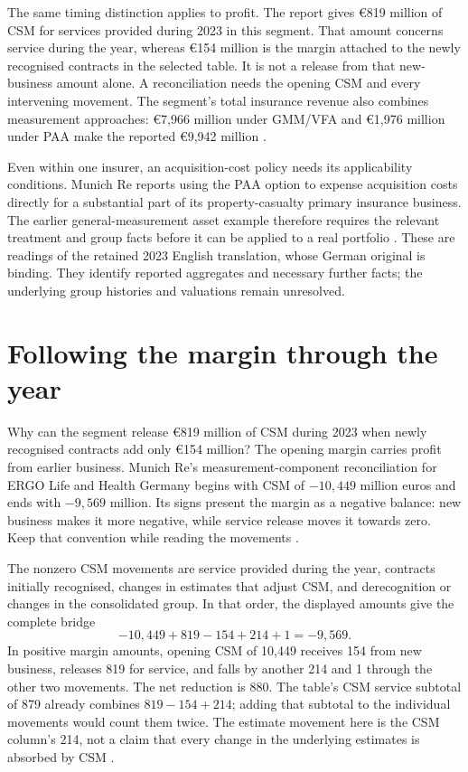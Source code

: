 The same timing distinction applies to profit. The report gives
€819 million of CSM for services provided during 2023 in this segment.
That amount concerns service during the year, whereas €154 million is
the margin attached to the newly recognised contracts in the selected table.
It is not a release from that new-business amount alone. A reconciliation
needs the opening CSM and every intervening movement. The segment's total
insurance revenue also combines measurement approaches: €7,966 million
under GMM/VFA and €1,976 million under PAA make the reported
€9,942 million \citep[printed pp. 253, 264]{munichre2023annual}.

Even within one insurer, an acquisition-cost policy needs its applicability
conditions. Munich Re reports using the PAA option to expense acquisition
costs directly for a substantial part of its property-casualty primary
insurance business. The earlier general-measurement asset example therefore
requires the relevant treatment and group facts before it can be applied to
a real portfolio \citep[printed p. 166]{munichre2023annual}. These are readings
of the retained 2023 English translation, whose German original is binding.
They identify reported aggregates and necessary further facts; the underlying
group histories and valuations remain unresolved.

\clearpage
\section{Following the margin through the year}
\label{sec:munich-csm-bridge}

Why can the segment release €819 million of CSM during 2023 when newly
recognised contracts add only €154 million? The opening margin carries profit
from earlier business. Munich Re's measurement-component reconciliation for
ERGO Life and Health Germany begins with CSM of $-10{,}449$ million euros
and ends with $-9{,}569$ million. Its signs present the margin as a negative
balance: new business makes it more negative, while service release moves
it towards zero. Keep that convention while reading the movements
\citep[printed p. 246]{munichre2023annual}.

The nonzero CSM movements are service provided during the year, contracts
initially recognised, changes in estimates that adjust CSM, and derecognition
or changes in the consolidated group. In that order, the displayed amounts
give the complete bridge
\[
 -10{,}449+819-154+214+1=-9{,}569.
\]
In positive margin amounts, opening CSM of 10,449 receives 154 from new
business, releases 819 for service, and falls by another 214 and 1 through
the other two movements. The net reduction is 880. The table's CSM service
subtotal of 879 already combines $819-154+214$; adding that subtotal to the
individual movements would count them twice. The estimate movement here is
the CSM column's 214, not a claim that every change in the underlying
estimates is absorbed by CSM \citep[printed p. 246]{munichre2023annual}.

